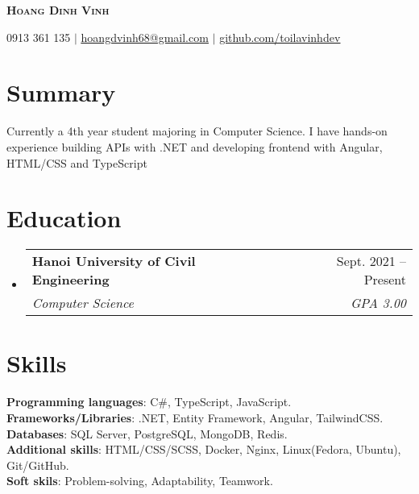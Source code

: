 \documentclass[letterpaper,11pt]{article}
\makeatletter
\newcommand{\resumeSubheading}[4]{
  \vspace{-2pt}
  \item
    \begin{tabular*}{0.97\textwidth}[t]{l@{\extracolsep{\fill}}r}
      \textbf{#1} & #2 \\
      \textit{\small#3} & \textit{\small #4} \\
    \end{tabular*}
    \vspace{-7pt}
}
\newcommand{\resumeSubHeadingListStart} {
    \begin{itemize}[leftmargin=0.15in, label={}]
}
\newcommand{\resumeSubHeadingListEnd} {
    \end{itemize}
}
\makeatother
\begin{document}
    \begin{center}
        \textbf{\Huge \scshape Hoang Dinh Vinh}
    \end{center}
    
    \begin{center}
        \small 0913 361 135 
        $|$
        \href{mailto:hoangdvinh68@gmail.com}{\underline{hoangdvinh68@gmail.com}} 
        $|$
        \href{https://github.com/toilavinhdev}{\underline{github.com/toilavinhdev}} 
    \end{center}

    \section{Summary}
        Currently a 4th year student majoring in Computer Science. I have hands-on experience building APIs with .NET and developing frontend with Angular, HTML/CSS and TypeScript

    \section{Education}
        \resumeSubHeadingListStart
            \resumeSubheading {Hanoi University of Civil Engineering} {Sept. 2021 -- Present} {Computer Science} {GPA 3.00}
        \resumeSubHeadingListEnd

    \section{Skills}
        \begin{itemize}[leftmargin=0.15in, label={}]
            \small{
                \item{
                    \vspace{1mm}
                    \textbf{Programming languages}{: C\#, TypeScript, JavaScript.} \\
                    \vspace{1mm}
                    \textbf{Frameworks/Libraries}{: .NET, Entity Framework, Angular, TailwindCSS.} \\
                    \vspace{1mm}
                    \textbf{Databases}{: SQL Server, PostgreSQL, MongoDB, Redis.} \\
                    \vspace{1mm}
                    \textbf{Additional skills}{: HTML/CSS/SCSS, Docker, Nginx, Linux(Fedora, Ubuntu), Git/GitHub.} \\
                    \vspace{1mm}
                    \textbf{Soft skils}{: Problem-solving, Adaptability, Teamwork.} \\
                    \vspace{1mm}
                }
            }
        \end{itemize}
\end{document}
